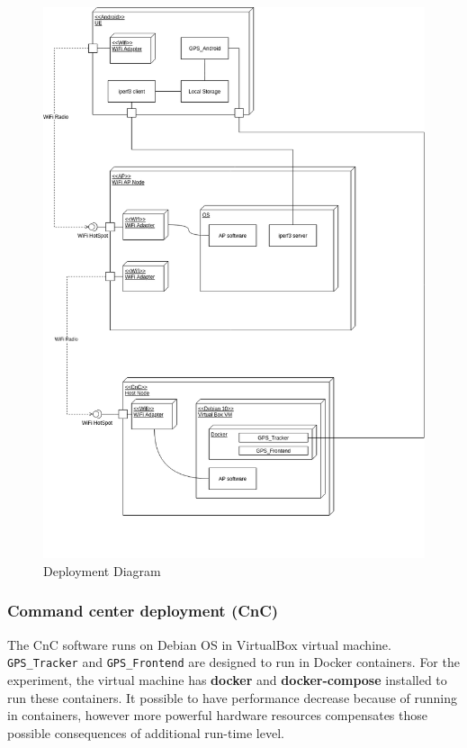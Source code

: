 \begin{figure}[H]
\centering
\includegraphics[width=\linewidth, keepaspectratio]{images/Deployment Diagram-Deployment_Diagram.png}
\caption{Deployment Diagram}
\label{fig:deployment-diagram}
\end{figure}

\hypertarget{command-center-deployment-cnc}{%
\subsubsection{Command center deployment
(CnC)}\label{command-center-deployment-cnc}}

The CnC software runs on Debian OS in VirtualBox virtual machine.
\texttt{GPS\_Tracker} and \texttt{GPS\_Frontend} are designed to run in
Docker containers. For the experiment, the virtual machine has \textbf{docker}
and \textbf{docker-compose} installed to run these containers. It possible to have performance decrease because of running in containers, however more powerful hardware resources compensates those possible consequences of additional run-time level.

